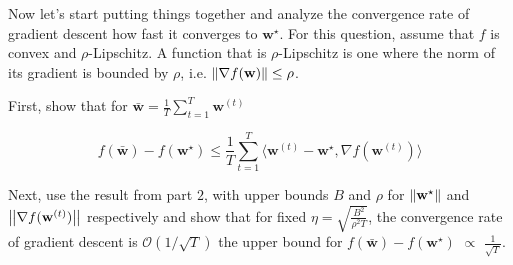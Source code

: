 
Now let's start putting things together and analyze the convergence rate of gradient descent \ie
how fast it converges to $\mathbf{w}^\star$. For this question, assume that $f$ is convex and $\rho$-Lipschitz. A function that is $\rho$-Lipschitz is one where the norm of its gradient is bounded by $\rho$, i.e. $\left| \hspace{-0.7pt}\left|\nabla f(\mathbf{w})\right| \hspace{-0.7pt}\right| \leq \rho$.

First, show that for $\mathbf{\bar w} = \frac{1}{T} \sum_{t=1}^T \mathbf{w}^{(t)}$

\begin{equation}
f(\mathbf{\bar w}) - f(\mathbf{w}^\star) \leq \frac{1}{T} \sum_{t=1}^T
\langle \mathbf{w}^{(t)}-\mathbf{w}^{\star}, \nabla f(\mathbf{w}^{(t)}) \rangle
\end{equation}

Next, use the result from part $2$, with upper bounds $B$ and $\rho$ for
$\left| \hspace{-0.7pt}\left|\mathbf{w}^\star\right| \hspace{-0.7pt}\right|$ and $\left| \hspace{-0.7pt}\left|\nabla f(\mathbf{w}^{(t)})\right| \hspace{-0.7pt}\right|$
respectively and show that for fixed $\eta = \sqrt{\frac{B^2}{\rho^2T}}$,
the convergence rate of gradient descent is $\mathcal{O}(1/\sqrt{T})$
\ie the upper bound for $f(\mathbf{\bar w}) - f(\mathbf{w}^\star)$
$\propto$ $\frac{1}{\sqrt{T}}$.